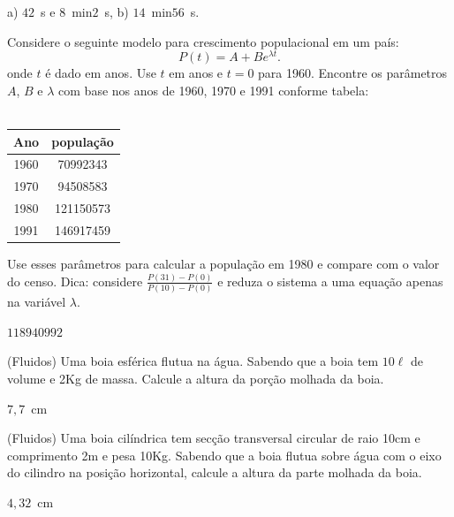 \begin{resp}

a) $42$~s e $8$~min$2$~s, b) $14$~min$56$~s.

\end{resp}


\begin{exer}\label{pop} Considere o seguinte modelo para crescimento populacional em um país:
\begin{equation} P(t)=A+Be^{\lambda t}. \end{equation}
onde $t$ é dado em anos. Use $t$ em anos e $t=0$ para 1960. Encontre os parâmetros $A$, $B$ e $\lambda$ com base nos anos de 1960, 1970 e 1991 conforme tabela:\\~

\begin{tabular}{|c|c|}
\hline
Ano & população\\
\hline
1960&70992343\\
1970&94508583\\
1980&121150573\\
1991&146917459\\
\hline
\end{tabular}

Use esses parâmetros para calcular a população em 1980 e compare com o valor do censo. Dica: considere $\frac{P(31)-P(0)}{P(10)-P(0)}$ e reduza o sistema a uma equação apenas na variável $\lambda$.
\end{exer}
\begin{resp}

$118940992$

\end{resp}

\begin{exer}(Fluidos) \label{boiaesf} Uma boia esférica flutua na água. Sabendo que a boia tem $10\ell$ de volume e 2Kg de massa. Calcule a altura da porção molhada da boia.
\end{exer}
\begin{resp}

$7,7$~cm

\end{resp}

\begin{exer}(Fluidos) \label{boiacil} Uma boia cilíndrica tem secção transversal circular de raio 10cm e comprimento 2m e pesa 10Kg. Sabendo que a boia flutua sobre água com o eixo do cilindro na posição horizontal, calcule a altura da parte molhada da boia.
\end{exer}
\begin{resp}

$4,32$~cm

\end{resp}

